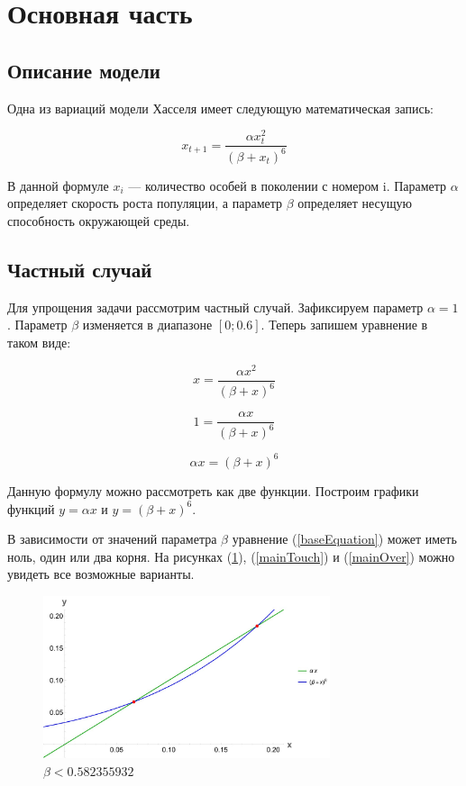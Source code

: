 \section{Основная часть}

    \subsection{Описание модели}

        Одна из вариаций модели Хасселя имеет следующую математическая запись:

        \[x_{t+1} = \frac{\alpha x_t^2}{(\beta + x_t)^6}\]

        В данной формуле \(x_i\) --- количество особей в поколении с номером i. Параметр \(\alpha\) определяет скорость роста популяции, а параметр \(\beta\) определяет несущую способность окружающей среды.
    
    \subsection{Частный случай}
    
        Для упрощения задачи рассмотрим частный случай. Зафиксируем параметр \(\alpha = 1\). Параметр \(\beta\) изменяется в диапазоне \([0; 0.6]\). Теперь запишем уравнение в таком виде:

        \[x = \frac{\alpha x^2}{(\beta + x)^6}\]
    
        \[1 = \frac{\alpha x}{(\beta + x)^6}\]

        \[
            \tag{1}
            \label{baseEquation}
            \alpha x = (\beta + x)^6
        \]

        Данную формулу можно рассмотреть как две функции. Построим графики функций \(y = \alpha x\) и \(y = (\beta + x)^6\). 
        
        В зависимости от значений параметра \(\beta\) уравнение (\ref{baseEquation}) может иметь ноль, один или два корня. На рисунках (\ref{mainIntersect}), (\ref{mainTouch}) и (\ref{mainOver}) можно увидеть все возможные варианты.
        
        \begin{figure}
            \centering
            \includegraphics[width=0.75\textwidth]{images/main_intersect.jpg}

            \captionsetup{justification=centering}
            \caption{\(\beta < 0.582355932\)}
            \label{mainIntersect}
        \end{figure}

